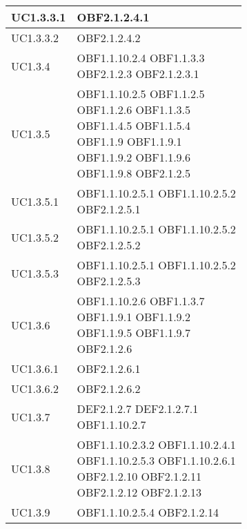 \documentclass{scalatekids-article}
\begin{document}
\begin{longtable}[H]{|p{5.5cm}|p{5.5cm}|}
\hline
UC1.3.3.1 & \multiLineCell[t]{OBF2.1.2.4.1\\}\\
\hline
UC1.3.3.2 & \multiLineCell[t]{OBF2.1.2.4.2\\}\\
\hline
UC1.3.4 & \multiLineCell[t]{OBF1.1.10.2.4 OBF1.1.3.3\\OBF2.1.2.3 OBF2.1.2.3.1\\}\\
\hline
UC1.3.5 & \multiLineCell[t]{OBF1.1.10.2.5 OBF1.1.2.5\\OBF1.1.2.6 OBF1.1.3.5\\OBF1.1.4.5 OBF1.1.5.4\\OBF1.1.9 OBF1.1.9.1\\OBF1.1.9.2 OBF1.1.9.6\\OBF1.1.9.8 OBF2.1.2.5\\}\\
\hline
UC1.3.5.1 & \multiLineCell[t]{OBF1.1.10.2.5.1 OBF1.1.10.2.5.2\\OBF2.1.2.5.1}\\
\hline
UC1.3.5.2 & \multiLineCell[t]{OBF1.1.10.2.5.1 OBF1.1.10.2.5.2\\OBF2.1.2.5.2}\\
\hline
UC1.3.5.3 & \multiLineCell[t]{OBF1.1.10.2.5.1 OBF1.1.10.2.5.2\\OBF2.1.2.5.3}\\
\hline
UC1.3.6 & \multiLineCell[t]{OBF1.1.10.2.6 OBF1.1.3.7\\OBF1.1.9.1 OBF1.1.9.2\\OBF1.1.9.5 OBF1.1.9.7\\OBF2.1.2.6}\\
\hline
UC1.3.6.1 & \multiLineCell[t]{OBF2.1.2.6.1\\}\\
\hline
UC1.3.6.2 & \multiLineCell[t]{OBF2.1.2.6.2\\}\\
\hline
UC1.3.7 & \multiLineCell[t]{DEF2.1.2.7 DEF2.1.2.7.1\\OBF1.1.10.2.7}\\
\hline
UC1.3.8 & \multiLineCell[t]{OBF1.1.10.2.3.2 OBF1.1.10.2.4.1\\OBF1.1.10.2.5.3 OBF1.1.10.2.6.1\\OBF2.1.2.10 OBF2.1.2.11\\OBF2.1.2.12 OBF2.1.2.13\\}\\
\hline
UC1.3.9 & \multiLineCell[t]{OBF1.1.10.2.5.4 OBF2.1.2.14\\}\\

\end{longtable}
\end{document}
